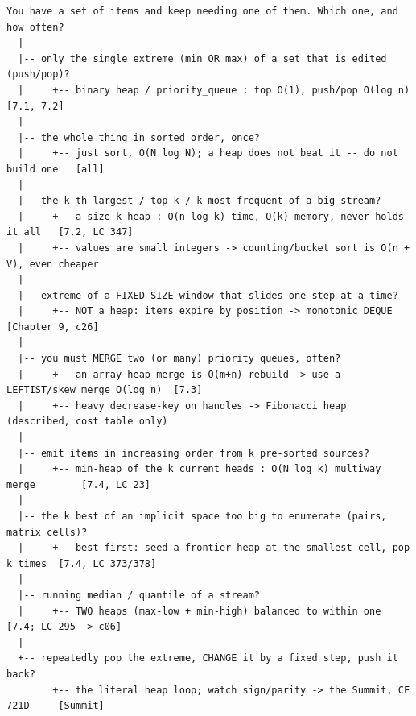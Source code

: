 \begin{lstlisting}[language={}, basicstyle=\ttfamily\small, numbers=none, frame=single]
  You have a set of items and keep needing one of them. Which one, and how often?
  |
  |-- only the single extreme (min OR max) of a set that is edited (push/pop)?
  |     +-- binary heap / priority_queue : top O(1), push/pop O(log n)   [7.1, 7.2]
  |
  |-- the whole thing in sorted order, once?
  |     +-- just sort, O(N log N); a heap does not beat it -- do not build one   [all]
  |
  |-- the k-th largest / top-k / k most frequent of a big stream?
  |     +-- a size-k heap : O(n log k) time, O(k) memory, never holds it all   [7.2, LC 347]
  |     +-- values are small integers -> counting/bucket sort is O(n + V), even cheaper
  |
  |-- extreme of a FIXED-SIZE window that slides one step at a time?
  |     +-- NOT a heap: items expire by position -> monotonic DEQUE [Chapter 9, c26]
  |
  |-- you must MERGE two (or many) priority queues, often?
  |     +-- an array heap merge is O(m+n) rebuild -> use a LEFTIST/skew merge O(log n)  [7.3]
  |     +-- heavy decrease-key on handles -> Fibonacci heap (described, cost table only)
  |
  |-- emit items in increasing order from k pre-sorted sources?
  |     +-- min-heap of the k current heads : O(N log k) multiway merge        [7.4, LC 23]
  |
  |-- the k best of an implicit space too big to enumerate (pairs, matrix cells)?
  |     +-- best-first: seed a frontier heap at the smallest cell, pop k times  [7.4, LC 373/378]
  |
  |-- running median / quantile of a stream?
  |     +-- TWO heaps (max-low + min-high) balanced to within one              [7.4; LC 295 -> c06]
  |
  +-- repeatedly pop the extreme, CHANGE it by a fixed step, push it back?
        +-- the literal heap loop; watch sign/parity -> the Summit, CF 721D     [Summit]
\end{lstlisting}


